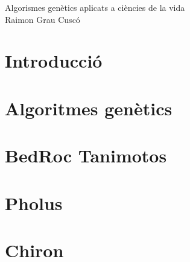 \documentclass[titlepage,a4paper,12pt]{book}
\begin{document}
\begin{titlepage}
\begin{center}
{\Huge Algorismes genètics aplicats a ciències de la vida}\\[2cm]
{\Large  Raimon Grau Cuscó }\\[5cm]

	\begin{figure}[h]
	\begin{center}
	\end{center}
	\end{figure}

	\begin{figure}[h]
	\begin{center}
	\end{center}
	\end{figure}
\end{center}
\end{titlepage}

\newpage{\pagestyle{empty}\cleardoublepage}


\tableofcontents

\newpage{\pagestyle{empty}\cleardoublepage}

\chapter{Introducció}
	
\chapter{Algoritmes genètics}

\chapter{BedRoc Tanimotos}
%
        
\chapter{Pholus} %
\label{cha:Pholus}


\chapter{Chiron} %
\label{cha:Chiron}

\end{document}

